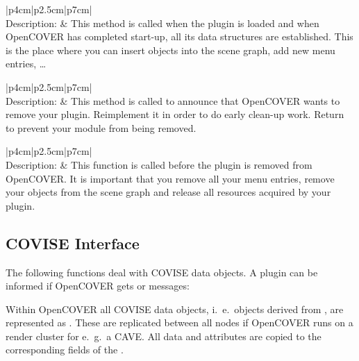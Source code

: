 \begin{longtable}{|p{4cm}|p{2.5cm}|p{7cm}|}
\hline
{}
{\bf {}}\\
\hline
{Description:}  
  & 
  {This method is called when the plugin is loaded and when OpenCOVER has
   completed start-up, all its data structures are established.
   This is the place where you can insert objects into the scene graph,
   add new menu entries, \ldots
  } \\
\hline
\end{longtable}


\begin{longtable}{|p{4cm}|p{2.5cm}|p{7cm}|}
\hline
{}
{\bf {}}\\
\hline
{Description:}  
  & 
  {This method is called to announce that OpenCOVER wants to remove your plugin.
   Reimplement it in order to do early clean-up work.
   Return  to prevent your module from being removed.
  } \\
\hline
\end{longtable}


\begin{longtable}{|p{4cm}|p{2.5cm}|p{7cm}|}
\hline
{}
{\bf {}}\\
\hline
{Description:} & 
        {This function is called before the plugin is removed from OpenCOVER.\newline
	 It is important that you remove all your menu entries,
         remove your objects from the scene graph and release all resources
         acquired by your plugin.
        }\\
\hline
\end{longtable}

\subsection{COVISE Interface}
\label{COVER:covise}

The following functions deal with COVISE data objects. A plugin can be 
informed if OpenCOVER gets  or  messages:

Within OpenCOVER all COVISE data objects, i.~e.\ objects derived from
, are represented as .
These are replicated between all nodes if OpenCOVER runs on a render cluster for e.~g.\ a CAVE.
All data and attributes are copied to the corresponding fields of the .

